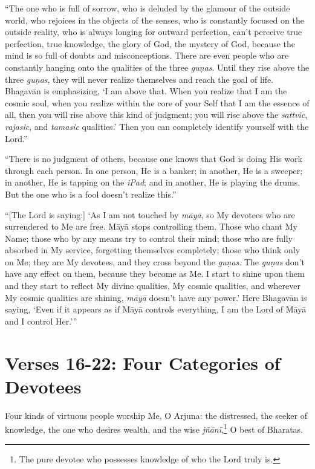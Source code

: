\enquote{The one who is full of sorrow, who is deluded by the glamour of the outside world, who rejoices in the objects of the senses, who is constantly focused on the outside reality, who is always longing for outward perfection, can’t perceive true perfection, true knowledge, the glory of God, the mystery of God, because the mind is so full of doubts and misconceptions. There are even people who are constantly hanging onto the qualities of the three \textit{guṇas}. Until they rise above the three \textit{guṇas}, they will never realize themselves and reach the goal of life. Bhagavān is emphasizing, \enquote{I am above that. When you realize that I am the cosmic soul, when you realize within the core of your Self that I am the essence of all, then you will rise above this kind of judgment; you will rise above the \textit{sattvic}, \textit{rajasic}, and \textit{tamasic} qualities.} Then you can completely identify yourself with the Lord.}

\enquote{There is no judgment of others, because one knows that God is doing His work through each person. In one person, He is a banker; in another, He is a sweeper; in another, He is tapping on the \textit{iPad}; and in another, He is playing the drums. But the one who is a fool doesn’t realize this.}

\enquote{[The Lord is saying:] \enquote{As I am not touched by \textit{māyā}, so My devotees who are surrendered to Me are free. Māyā stops controlling them. Those who chant My Name; those who by any means try to control their mind; those who are fully absorbed in My service, forgetting themselves completely; those who think only on Me; they are My devotees, and they cross beyond the \textit{guṇas}. The \textit{guṇas} don’t have any effect on them, because they become as Me. I start to shine upon them and they start to reflect My divine qualities, My cosmic qualities, and wherever My cosmic qualities are shining, \textit{māyā} doesn’t have any power.} Here Bhagavān is saying, \enquote{Even if it appears as if Māyā controls everything, I am the Lord of Māyā and I control Her.}}

\section{Verses 16-22: Four Categories of Devotees}\label{sec-verses-16-22-four-categories-of-devotees}

{Four kinds of virtuous people worship Me, O Arjuna: the distressed, the seeker of knowledge, the one who desires wealth, and the wise \textit{jñānī},\footnote{The pure devotee who possesses knowledge of who the Lord truly is.} O best of Bharatas.}

